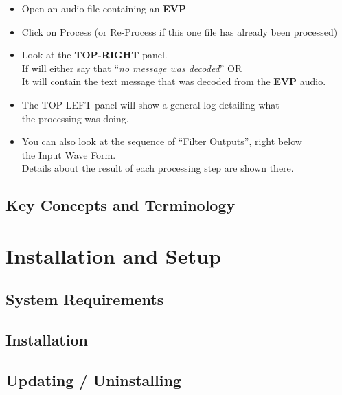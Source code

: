 \documentclass[11pt]{report}
\begin{document}
\begin{itemize}
    \item Open an audio file containing an \textbf{EVP}
         
    \item Click on Process (or Re-Process if this one file has already been processed)
         
    \item Look at the \textbf{TOP-RIGHT} panel.\\
          If will either say that ``\textit{no message was decoded}'' OR\\
          It will contain the text message that was decoded from the \textbf{EVP} audio.
         
    \item The TOP-LEFT panel will show a general log detailing what\\
          the processing was doing.
         
    \item You can also look at the sequence of ``Filter Outputs'', right below\\
           the Input Wave Form.\\
           Details about the result of each processing step are shown there.
\end{itemize}
    
    
    \section{Key Concepts and Terminology}
    
    \chapter{Installation and Setup}
    \section{System Requirements}
    \section{Installation}
    \section{Updating / Uninstalling}
\end{document}
